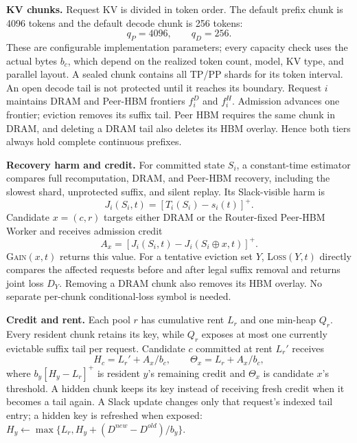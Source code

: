 \textbf{KV chunks.}
Request KV is divided in token order.  The default prefix chunk is 4096 tokens
and the default decode chunk is 256 tokens:
\begin{equation}
 q_{P}=4096,\qquad q_{D}=256.
 \label{eq:chunk-granularity}
\end{equation}
These are configurable implementation parameters; every capacity check uses
the actual bytes $b_c$, which depend on the realized token count, model, KV
type, and parallel layout.  A sealed chunk contains all TP/PP shards for its
token interval.  An open decode tail is not protected until it reaches its
boundary.  Request $i$ maintains DRAM and Peer-HBM frontiers $f_i^D$ and
$f_i^H$.  Admission advances one frontier; eviction removes its suffix tail.
Peer HBM requires the same chunk in DRAM, and deleting a DRAM tail also deletes
its HBM overlay.  Hence both tiers always hold complete continuous prefixes.

\textbf{Recovery harm and credit.}
For committed state $S_i$, a constant-time estimator compares full
recomputation, DRAM, and Peer-HBM recovery, including the slowest shard,
unprotected suffix, and silent replay.  Its Slack-visible harm is
\begin{equation}
 J_i(S_i,t)=[T_i(S_i)-s_i(t)]^+.
 \label{eq:recovery-harm}
\end{equation}
Candidate $x=(c,r)$ targets either DRAM or the Router-fixed Peer-HBM Worker and
receives admission credit
\begin{equation}
 A_x=[J_i(S_i,t)-J_i(S_i\oplus x,t)]^+.
 \label{eq:chunk-credit}
\end{equation}
\textsc{Gain}$(x,t)$ returns this value.  For a tentative eviction set $Y$,
\textsc{Loss}$(Y,t)$ directly compares the affected requests before and after
legal suffix removal and returns joint loss $D_Y$.  Removing a DRAM chunk also
removes its HBM overlay.  No separate per-chunk conditional-loss symbol is
needed.

\textbf{Credit and rent.}
Each pool $r$ has cumulative rent $L_r$ and one min-heap $Q_r$.  Every resident
chunk retains its key, while $Q_r$ exposes at most one currently evictable
suffix tail per request.  Candidate $c$ committed at rent $L_r'$ receives
\begin{equation}
 H_c=L_r'+A_x/b_c,
 \qquad \Theta_x=L_r+A_x/b_c,
 \label{eq:landlord-credit}
\end{equation}
where $b_y[H_y-L_r]^+$ is resident $y$'s remaining credit and $\Theta_x$ is
candidate $x$'s threshold.  A hidden chunk keeps its key instead of receiving
fresh credit when it becomes a tail again.  A Slack update changes only that
request's indexed tail entry; a hidden key is refreshed when exposed:
$H_y\leftarrow\max\{L_r,H_y+(D^{new}-D^{old})/b_y\}$.

